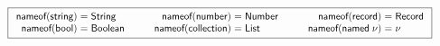 \documentclass[10pt,preprint,blind,clearpagebib]{sigplanconf}
\newcommand{\ident}[1]{\textnormal{\sffamily #1}}
\newcommand{\narrow}[1]{\hspace{-0.7em} #1 \hspace{-0.7em}}
\newcommand{\nameoftag}{\ident{nameof}}
\begin{document}
\begin{figure}
\noindent
\begin{equation*}
\quad\qquad\boxed{
\begin{array}{rcl}
 \nameoftag(\ident{string}) &\narrow{=}& \ident{String} \\
 \nameoftag(\ident{bool}) &\narrow{=}& \ident{Boolean} \\
\end{array}
\qquad
\begin{array}{rcl}
 \nameoftag(\ident{number}) &\narrow{=}& \ident{Number} \\
 \nameoftag(\ident{collection}) &\narrow{=}& \ident{List} \\
\end{array}
\qquad
\begin{array}{rcl}
 \nameoftag(\ident{record}) &\narrow{=}& \ident{Record} \\
 \nameoftag(\ident{named}\;\nu) &\narrow{=}& \nu \\
\end{array}
}
\end{equation*}


\end{figure}
\end{document}
